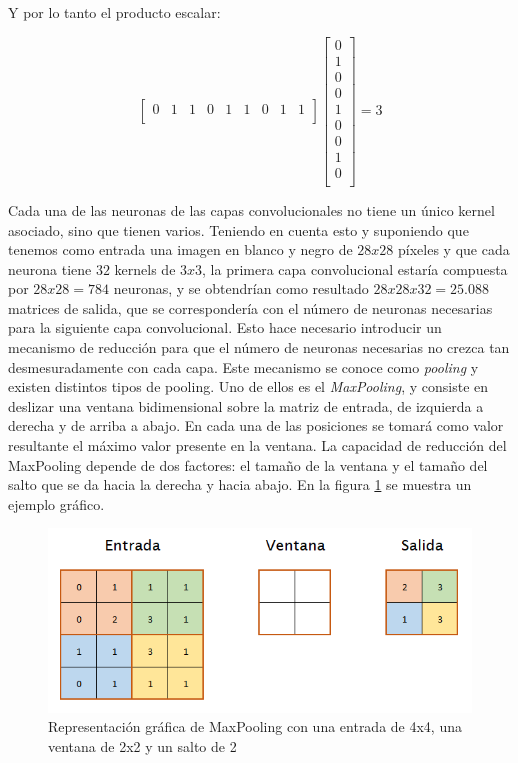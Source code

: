 Y por lo tanto el producto escalar:

\begin{equation}
	\left[
	\begin{array}{ccccccccc}
		0 & 1 & 1 & 0 & 1 & 1 & 0 & 1 & 1 \\
	\end{array}
	\right]
	\left[
	\begin{array}{c}
		0 \\
		1 \\
		0 \\
		0 \\
		1 \\
		0 \\
		0 \\
		1 \\
		0 \\
	\end{array}
	\right] = 3
	\nonumber
\end{equation}

Cada una de las neuronas de las capas convolucionales no tiene un único kernel asociado, sino que tienen varios. Teniendo en cuenta esto y suponiendo que tenemos como entrada una imagen en blanco y negro de $28x28$ píxeles y que cada neurona tiene $32$ kernels de $3x3$, la primera capa convolucional estaría compuesta por $28 x 28 = 784$ neuronas, y se obtendrían como resultado $28 x 28 x 32 = 25.088$ matrices de salida, que se correspondería con el número de neuronas necesarias para la siguiente capa convolucional. Esto hace necesario introducir un mecanismo de reducción para que el número de neuronas necesarias no crezca tan desmesuradamente con cada capa. Este mecanismo se conoce como \textit{pooling} y existen distintos tipos de pooling. Uno de ellos es el \textit{MaxPooling}, y consiste en deslizar una ventana bidimensional sobre la matriz de entrada, de izquierda a derecha y de arriba a abajo. En cada una de las posiciones se tomará como valor resultante el máximo valor presente en la ventana. La capacidad de reducción del MaxPooling depende de dos factores: el tamaño de la ventana y el tamaño del salto que se da hacia la derecha y hacia abajo. En la figura \ref{fig:cnn_maxpooling} se muestra un ejemplo gráfico.

\begin{figure}[H]
	\centering
	\includegraphics[width=0.7\linewidth]{images/maxpooling_example.png}
	\caption{Representación gráfica de MaxPooling con una entrada de 4x4, una ventana de 2x2 y un salto de 2}
	\label{fig:cnn_maxpooling}
\end{figure}

